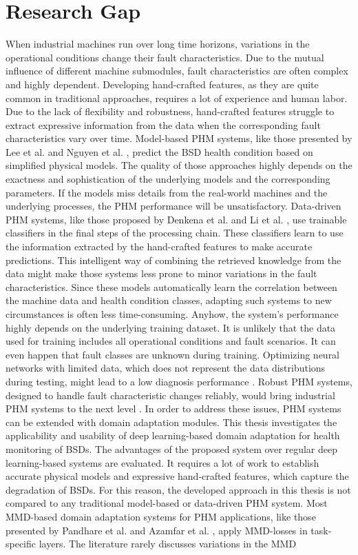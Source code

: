 \section{Research Gap}
When industrial machines run over long time horizons, variations in the operational conditions change their fault characteristics. Due to the mutual influence of different machine submodules, fault characteristics are often complex and highly dependent. Developing hand-crafted features, as they are quite common in traditional approaches, requires a lot of experience and human labor. Due to the lack of flexibility and robustness, hand-crafted features struggle to extract expressive information from the data when the corresponding fault characteristics vary over time. Model-based PHM systems, like those presented by Lee et al. \cite{Lee2015} and Nguyen et al. \cite{NGUYEN2019},  predict the BSD health condition based on simplified physical models. The quality of those approaches highly depends on the exactness and sophistication of the underlying models and the corresponding parameters. If the models miss details from the real-world machines and the underlying processes, the PHM performance will be unsatisfactory. Data-driven PHM systems, like those proposed by Denkena et al. \cite{Denkena2021} and Li et al. \cite{LiPin2018}, use trainable classifiers in the final steps of the processing chain. These classifiers learn to use the information extracted by the hand-crafted features to make accurate predictions. This intelligent way of combining the retrieved knowledge from the data might make those systems less prone to minor variations in the fault characteristics. Since these models automatically learn the correlation between the machine data and health condition classes, adapting such systems to new circumstances is often less time-consuming. Anyhow, the system's performance highly depends on the underlying training dataset. It is unlikely that the data used for training includes all operational conditions and fault scenarios. It can even happen that fault classes are unknown during training. Optimizing neural networks with limited data, which does not represent the data distributions during testing, might lead to a low diagnosis performance \cite{AZAMFAR2020103932}. Robust PHM systems, designed to handle fault characteristic changes reliably, would bring industrial PHM systems to the next level \cite{Michau2017}. In order to address these issues, PHM systems can be extended with domain adaptation modules. This thesis investigates the applicability and usability of deep learning-based domain adaptation for health monitoring of BSDs. The advantages of the proposed system over regular deep learning-based systems are evaluated. It requires a lot of work to establish accurate physical models and expressive hand-crafted features, which capture the degradation of BSDs. For this reason, the developed approach in this thesis is not compared to any traditional model-based or data-driven PHM system. Most MMD-based domain adaptation systems for PHM applications, like those presented by Pandhare et al. \cite{Pandhare2021} and Azamfar et al. \cite{AZAMFAR2020103932}, apply MMD-losses in task-specific layers. The literature rarely discusses variations in the MMD 